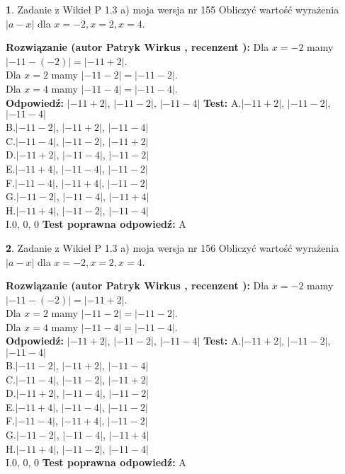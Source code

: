 \documentclass[12pt, a4paper]{article}
\theoremstyle{definition} %
\newtheorem{zad}{}
\newcommand{\zadStart}[1]{\begin{zad}#1\newline}
\newcommand{\zadStop}{\end{zad}}
\newcommand{\rozwStart}[2]{\noindent \textbf{Rozwiązanie (autor #1 , recenzent #2): }\newline}
\newcommand{\rozwStop}{\newline}
\newcommand{\odpStart}{\noindent \textbf{Odpowiedź:}\newline}
\newcommand{\odpStop}{\newline}
\newcommand{\testStart}{\noindent \textbf{Test:}\newline}
\newcommand{\testStop}{\newline}
\newcommand{\kluczStart}{\noindent \textbf{Test poprawna odpowiedź:}\newline}
\newcommand{\kluczStop}{\newline}
\begin{document}
\zadStart{Zadanie z Wikieł P 1.3 a) moja wersja nr 155}
Obliczyć wartość wyrażenia $|a - x|$ dla $x=-2,x=2,x=4$.
\zadStop
\rozwStart{Patryk Wirkus}{}
Dla $x = -2$ mamy $|-11 - (-2)| = |-11 + 2|$.\\
Dla $x = 2$ mamy $|-11 - 2| = |-11 - 2|$.\\
Dla $x = 4$ mamy $|-11 - 4| = |-11 - 4|$.\\
\rozwStop
\odpStart
$|-11 + 2|$, $|-11 - 2|$, $|-11 - 4|$
\odpStop
\testStart
A.$|-11 + 2|$, $|-11 - 2|$, $|-11 - 4|$\\
B.$|-11 - 2|$, $|-11 + 2|$, $|-11 - 4|$\\
C.$|-11 - 4|$, $|-11 - 2|$, $|-11 + 2|$\\
D.$|-11 + 2|$, $|-11 - 4|$, $|-11 - 2|$\\
E.$|-11 + 4|$, $|-11 - 4|$, $|-11 - 2|$\\
F.$|-11 - 4|$, $|-11 + 4|$, $|-11 - 2|$\\
G.$|-11 - 2|$, $|-11 - 4|$, $|-11 + 4|$\\
H.$|-11 + 4|$, $|-11 - 2|$, $|-11 - 4|$\\
I.$0$, $0$, $0$
\testStop
\kluczStart
A
\kluczStop



\zadStart{Zadanie z Wikieł P 1.3 a) moja wersja nr 156}
Obliczyć wartość wyrażenia $|a - x|$ dla $x=-2,x=2,x=4$.
\zadStop
\rozwStart{Patryk Wirkus}{}
Dla $x = -2$ mamy $|-11 - (-2)| = |-11 + 2|$.\\
Dla $x = 2$ mamy $|-11 - 2| = |-11 - 2|$.\\
Dla $x = 4$ mamy $|-11 - 4| = |-11 - 4|$.\\
\rozwStop
\odpStart
$|-11 + 2|$, $|-11 - 2|$, $|-11 - 4|$
\odpStop
\testStart
A.$|-11 + 2|$, $|-11 - 2|$, $|-11 - 4|$\\
B.$|-11 - 2|$, $|-11 + 2|$, $|-11 - 4|$\\
C.$|-11 - 4|$, $|-11 - 2|$, $|-11 + 2|$\\
D.$|-11 + 2|$, $|-11 - 4|$, $|-11 - 2|$\\
E.$|-11 + 4|$, $|-11 - 4|$, $|-11 - 2|$\\
F.$|-11 - 4|$, $|-11 + 4|$, $|-11 - 2|$\\
G.$|-11 - 2|$, $|-11 - 4|$, $|-11 + 4|$\\
H.$|-11 + 4|$, $|-11 - 2|$, $|-11 - 4|$\\
I.$0$, $0$, $0$
\testStop
\kluczStart
A
\kluczStop
\end{document}

